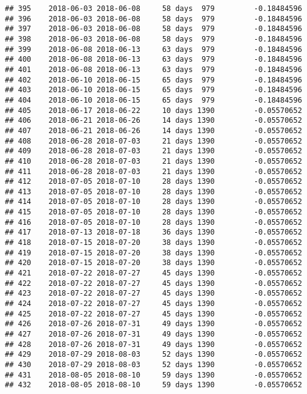 \documentclass[]{article}
\begin{document}
\begin{verbatim}
## 395    2018-06-03 2018-06-08     58 days  979         -0.18484596
## 396    2018-06-03 2018-06-08     58 days  979         -0.18484596
## 397    2018-06-03 2018-06-08     58 days  979         -0.18484596
## 398    2018-06-03 2018-06-08     58 days  979         -0.18484596
## 399    2018-06-08 2018-06-13     63 days  979         -0.18484596
## 400    2018-06-08 2018-06-13     63 days  979         -0.18484596
## 401    2018-06-08 2018-06-13     63 days  979         -0.18484596
## 402    2018-06-10 2018-06-15     65 days  979         -0.18484596
## 403    2018-06-10 2018-06-15     65 days  979         -0.18484596
## 404    2018-06-10 2018-06-15     65 days  979         -0.18484596
## 405    2018-06-17 2018-06-22     10 days 1390         -0.05570652
## 406    2018-06-21 2018-06-26     14 days 1390         -0.05570652
## 407    2018-06-21 2018-06-26     14 days 1390         -0.05570652
## 408    2018-06-28 2018-07-03     21 days 1390         -0.05570652
## 409    2018-06-28 2018-07-03     21 days 1390         -0.05570652
## 410    2018-06-28 2018-07-03     21 days 1390         -0.05570652
## 411    2018-06-28 2018-07-03     21 days 1390         -0.05570652
## 412    2018-07-05 2018-07-10     28 days 1390         -0.05570652
## 413    2018-07-05 2018-07-10     28 days 1390         -0.05570652
## 414    2018-07-05 2018-07-10     28 days 1390         -0.05570652
## 415    2018-07-05 2018-07-10     28 days 1390         -0.05570652
## 416    2018-07-05 2018-07-10     28 days 1390         -0.05570652
## 417    2018-07-13 2018-07-18     36 days 1390         -0.05570652
## 418    2018-07-15 2018-07-20     38 days 1390         -0.05570652
## 419    2018-07-15 2018-07-20     38 days 1390         -0.05570652
## 420    2018-07-15 2018-07-20     38 days 1390         -0.05570652
## 421    2018-07-22 2018-07-27     45 days 1390         -0.05570652
## 422    2018-07-22 2018-07-27     45 days 1390         -0.05570652
## 423    2018-07-22 2018-07-27     45 days 1390         -0.05570652
## 424    2018-07-22 2018-07-27     45 days 1390         -0.05570652
## 425    2018-07-22 2018-07-27     45 days 1390         -0.05570652
## 426    2018-07-26 2018-07-31     49 days 1390         -0.05570652
## 427    2018-07-26 2018-07-31     49 days 1390         -0.05570652
## 428    2018-07-26 2018-07-31     49 days 1390         -0.05570652
## 429    2018-07-29 2018-08-03     52 days 1390         -0.05570652
## 430    2018-07-29 2018-08-03     52 days 1390         -0.05570652
## 431    2018-08-05 2018-08-10     59 days 1390         -0.05570652
## 432    2018-08-05 2018-08-10     59 days 1390         -0.05570652

\end{verbatim}
\end{document}
